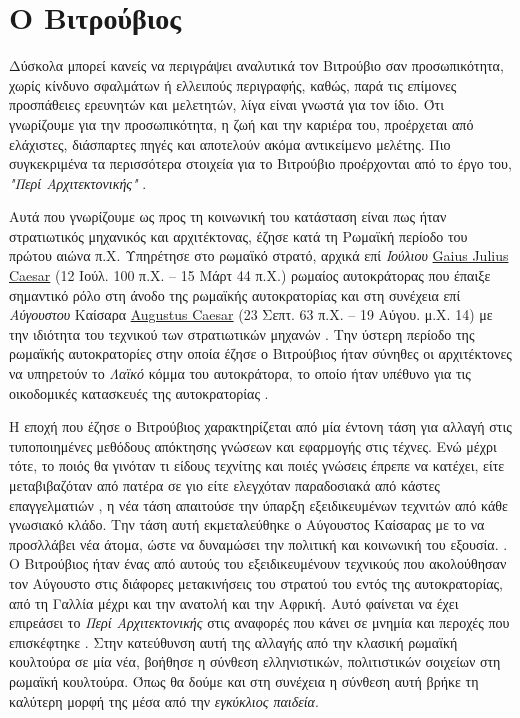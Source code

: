 
\section{Ο Βιτρούβιος}

Δύσκολα μπορεί κανείς να περιγράψει αναλυτικά τον Βιτρούβιο
σαν προσωπικότητα, χωρίς κίνδυνο σφαλμάτων ή ελλειπούς περιγραφής, καθώς, παρά τις επίμονες προσπάθειες ερευνητών και μελετητών, λίγα είναι γνωστά για τον ίδιο. Ότι γνωρίζουμε για την προσωπικότητα, η ζωή και την καριέρα του, προέρχεται από ελάχιστες, διάσπαρτες πηγές και αποτελούν ακόμα αντικείμενο μελέτης. Πιο συγκεκριμένα τα περισσότερα στοιχεία για το Βιτρούβιο προέρχονται από το έργο του, \emph{"Περί Αρχιτεκτονικής"} \cite{vitruvius-lefas,baldwin-1990,masterson_status_2004}.

Αυτά που γνωρίζουμε ως προς τη κοινωνική του κατάσταση είναι πως ήταν στρατιωτικός μηχανικός και αρχιτέκτονας, έζησε κατά τη Ρωμαϊκή περίοδο του πρώτου αιώνα π.Χ. Υπηρέτησε στο ρωμαϊκό  στρατό, αρχικά επί \emph{Ιούλιου} \sidenote%
    {\href{https://en.wikipedia.org/wiki/Julius_Caesar}{Gaius
    Julius Caesar} (12 Ιούλ. 100 π.Χ. – 15 Μάρτ 44 π.Χ.) ρωμαίος
    αυτοκράτορας που έπαιξε σημαντικό ρόλο στη άνοδο της ρωμαϊκής
    αυτοκρατορίας}
και στη συνέχεια επί \emph{Αύγουστου} Καίσαρα \sidenote%
    {\href{https://en.wikipedia.org/wiki/Augustus}{Augustus Caesar}
    (23 Σεπτ. 63 π.Χ. – 19 Αύγου. μ.Χ. 14)} 
με την ιδιότητα του τεχνικού των στρατιωτικών μηχανών \cite{vitruvius-lefas,enwiki:vitruvius}. Την ύστερη περίοδο της ρωμαϊκής αυτοκρατορίες στην οποία έζησε ο Βιτρούβιος ήταν σύνηθες οι αρχιτέκτονες να υπηρετούν το \emph{Λαϊκό} κόμμα του αυτοκράτορα, το οποίο ήταν υπέθυνο για τις οικοδομικές κατασκευές της αυτοκρατορίας \cite[σ. 13]{vitruvius-lefas}.

Η εποχή που έζησε ο Βιτρούβιος χαρακτηρίζεται από μία έντονη τάση για αλλαγή στις τυποποιημένες μεθόδους απόκτησης γνώσεων και εφαρμογής στις τέχνες. Ενώ μέχρι τότε, το ποιός θα γινόταν τι είδους τεχνίτης και ποιές γνώσεις έπρεπε να κατέχει, είτε μεταβιβαζόταν από πατέρα σε γιο είτε ελεγχόταν παραδοσιακά από κάστες επαγγελματιών , η νέα τάση απαιτούσε την ύπαρξη εξειδικευμένων τεχνιτών από κάθε γνωσιακό κλάδο. Την τάση αυτή εκμεταλεύθηκε ο Αύγουστος Καίσαρας με το να προσλλάβει νέα άτομα, ώστε να δυναμώσει την πολιτική και κοινωνική του εξουσία. \cite{masterson_status_2004,brown-vitruvius}. Ο Βιτρούβιος ήταν ένας από αυτούς του εξειδικευμένουν τεχνικούς που ακολούθησαν τον Αύγουστο στις διάφορες μετακινήσεις του στρατού του εντός της αυτοκρατορίας, από τη Γαλλία μέχρι και την ανατολή και την Αφρική. Αυτό φαίνεται να έχει επιρεάσει το \emph{Περί Αρχιτεκτονικής} στις αναφορές που κάνει σε μνημία και περοχές που επισκέφτηκε \cite[σ. 13]{vitruvius-lefas}. Στην κατεύθυνση αυτή της αλλαγής από την κλασική ρωμαϊκή κουλτούρα σε μία νέα, βοήθησε η σύνθεση ελληνιστικών, πολιτιστικών σοιχείων στη ρωμαϊκή κουλτούρα. Όπως θα δούμε και στη συνέχεια η σύνθεση αυτή βρήκε τη καλύτερη μορφή της μέσα από την \emph{εγκύκλιος παιδεία}.


